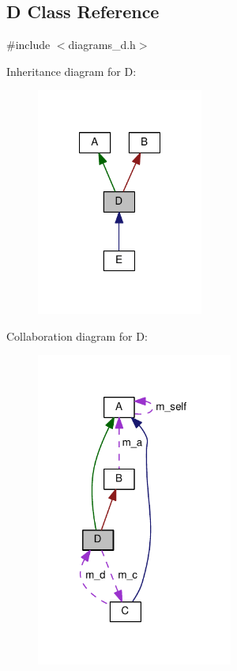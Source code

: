 \hypertarget{class_d}{}\subsection{D Class Reference}
\label{class_d}


{\ttfamily \#include $<$diagrams\+\_\+d.\+h$>$}



Inheritance diagram for D\+:
\nopagebreak
\begin{figure}[H]
\begin{center}
\leavevmode
\includegraphics[width=155pt]{class_d__inherit__graph}
\end{center}
\end{figure}


Collaboration diagram for D\+:
\nopagebreak
\begin{figure}[H]
\begin{center}
\leavevmode
\includegraphics[width=183pt]{class_d__coll__graph}
\end{center}
\end{figure}
